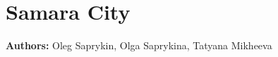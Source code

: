 \chapter{Samara City}
\label{ch:samara}
\hfill \textbf{Authors:} Oleg Saprykin, Olga Saprykina, Tatyana Mikheeva

